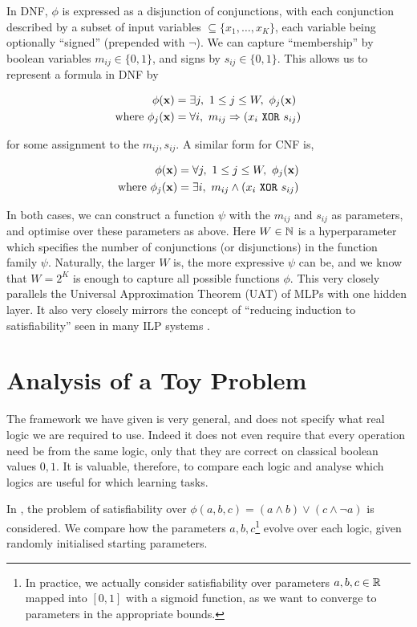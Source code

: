 In DNF, $\phi$ is expressed as a disjunction of conjunctions, with each conjunction described by a subset of input variables $\subseteq \{x_1,\dots,x_K\}$, each variable being optionally ``signed'' (prepended with $\lnot$). We can capture ``membership'' by boolean variables $m_{ij} \in \{0,1\}$, and signs by $s_{ij} \in \{0,1\}$. This allows us to represent a formula in DNF by

$$
\begin{aligned}
\phi(\mathbf{x}) &= \exists j,\ 1 \leq j \leq W,\ \phi_j(\mathbf{x}) \\
\text{where } \phi_j(\mathbf{x}) &= \forall i,\ m_{ij} \Rightarrow (x_i \ \texttt{XOR}\  s_{ij})
\end{aligned}
$$

for some assignment to the $m_{ij}, s_{ij}$. A similar form for CNF is,

$$
\begin{aligned}
\phi(\mathbf{x}) &= \forall j,\ 1 \leq j \leq W,\ \phi_j(\mathbf{x}) \\
\text{where } \phi_j(\mathbf{x}) &= \exists i,\ m_{ij} \land (x_i \ \texttt{XOR}\  s_{ij})
\end{aligned}
$$

In both cases, we can construct a function $\psi$ with the $m_{ij}$ and $s_{ij}$ as parameters, and optimise over these parameters as above. Here $W \in\mathbb{N}$ is a hyperparameter which specifies the number of conjunctions (or disjunctions) in the function family $\psi$. Naturally, the larger $W$ is, the more expressive $\psi$ can be, and we know that $W = 2^K$ is enough to capture all possible functions $\phi$. This very closely parallels the Universal Approximation Theorem (UAT) of MLPs with one hidden layer. It also very closely mirrors the concept of ``reducing induction to satisfiability'' seen in many ILP systems \cite{diffilp}.

\section{Analysis of a Toy Problem}

The framework we have given is very general, and does not specify what real logic we are required to use. Indeed it does not even require that every operation need be from the same logic, only that they are correct on classical boolean values $0,1$. It is valuable, therefore, to compare each logic and analyse which logics are useful for which learning tasks.

In \cite{analyzefuzzy}, the problem of satisfiability over $\phi(a,b,c) = (a \land b) \lor (c \land \lnot a)$ is considered. We compare how the parameters $a, b, c$\footnote{In practice, we actually consider satisfiability over parameters $a, b, c \in \mathbb{R}$ mapped into $[0,1]$ with a sigmoid function, as we want to converge to parameters in the appropriate bounds.} evolve over each logic, given randomly initialised starting parameters.

